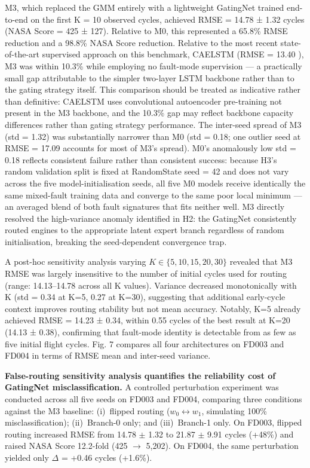 \documentclass[review,12pt]{elsarticle}
\begin{document}
M3, which replaced the GMM entirely with a lightweight GatingNet trained end-to-end on the first K = 10 observed cycles, achieved RMSE = 14.78 ± 1.32 cycles (NASA Score = 425 ± 127). Relative to M0, this represented a 65.8\% RMSE reduction and a 98.8\% NASA Score reduction. Relative to the most recent state-of-the-art supervised approach on this benchmark, CAELSTM (RMSE = 13.40 \cite{ref15}), M3 was within 10.3\% while employing no fault-mode supervision — a practically small gap attributable to the simpler two-layer LSTM backbone rather than to the gating strategy itself. This comparison should be treated as indicative rather than definitive: CAELSTM uses convolutional autoencoder pre-training not present in the M3 backbone, and the 10.3\% gap may reflect backbone capacity differences rather than gating strategy performance. The inter-seed spread of M3 (std = 1.32) was substantially narrower than M0 (std = 0.18; one outlier seed at RMSE = 17.09 accounts for most of M3's spread). M0's anomalously low std = 0.18 reflects consistent failure rather than consistent success: because H3's random validation split is fixed at RandomState seed = 42 and does not vary across the five model-initialisation seeds, all five M0 models receive identically the same mixed-fault training data and converge to the same poor local minimum --- an averaged blend of both fault signatures that fits neither well. M3 directly resolved the high-variance anomaly identified in H2: the GatingNet consistently routed engines to the appropriate latent expert branch regardless of random initialisation, breaking the seed-dependent convergence trap.

A post-hoc sensitivity analysis varying $K \in \{5, 10, 15, 20, 30\}$ revealed that M3 RMSE was largely insensitive to the number of initial cycles used for routing (range: 14.13–14.78 across all K values). Variance decreased monotonically with K (std = 0.34 at K=5, 0.27 at K=30), suggesting that additional early-cycle context improves routing stability but not mean accuracy. Notably, K=5 already achieved RMSE = 14.23 ± 0.34, within 0.55 cycles of the best result at K=20 (14.13 ± 0.38), confirming that fault-mode identity is detectable from as few as five initial flight cycles. Fig. 7 compares all four architectures on FD003 and FD004 in terms of RMSE mean and inter-seed variance.

\textbf{False-routing sensitivity analysis quantifies the reliability cost of GatingNet misclassification.} A controlled perturbation experiment was conducted across all five seeds on FD003 and FD004, comparing three conditions against the M3 baseline: (i)~flipped routing ($w_0 \leftrightarrow w_1$, simulating 100\% misclassification); (ii)~Branch-0 only; and (iii)~Branch-1 only. On FD003, flipped routing increased RMSE from 14.78 $\pm$ 1.32 to 21.87 $\pm$ 9.91 cycles (+48\%) and raised NASA Score 12.2-fold (425 $\rightarrow$ 5,202). On FD004, the same perturbation yielded only $\Delta$ = +0.46 cycles (+1.6\%).
\end{document}
